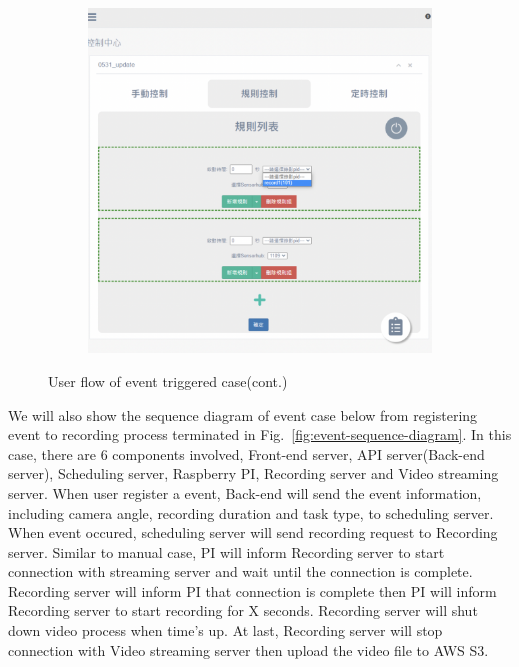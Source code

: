 \begin{figure}[H]
    \ContinuedFloat
    \centering
    \begin{subfigure}{\textwidth}
        \includegraphics[width=\textwidth]{figsrc/event-userflow-c.png}
        \label{fig:event-userflow-c}
    \end{subfigure}

    \caption{User flow of event triggered case(cont.)}
    \label{fig:event-userflow}
\end{figure}

We will also show the sequence diagram of event case below from registering event to recording process terminated in Fig.~\ref{fig:event-sequence-diagram}. In this case, there are 6 components involved, Front-end server, API server(Back-end server), Scheduling server, Raspberry PI, Recording server and Video streaming server. When user register a event, Back-end will send the event information, including camera angle, recording duration and task type, to scheduling server. When event occured, scheduling server will send recording request to Recording server. Similar to manual case, PI will inform Recording server to start connection with streaming server and wait until the connection is complete. Recording server will inform PI that connection is complete then PI will inform Recording server to start recording for X seconds. Recording server will shut down video process when time's up. At last, Recording server will stop connection with Video streaming server then upload the video file to AWS S3.

